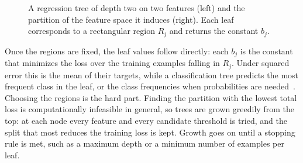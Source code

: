    \begin{figure}[t]
    \centering
    \caption{A regression tree of depth two on two features (left) and the
    partition of the feature space it induces (right). Each leaf corresponds to a
    rectangular region $R_j$ and returns the constant $b_j$.}
    \label{fig:bg:gbm:tree}
    \end{figure}
    
    Once the regions are fixed, the leaf values follow directly: each $b_j$ is the
    constant that minimizes the loss over the training examples falling in $R_j$.
    Under squared error this is the mean of their targets, while a classification
    tree predicts the most frequent class in the leaf, or the class frequencies
    when probabilities are needed~\cite{hastie2009}. Choosing the regions is the
    hard part. Finding the partition with the lowest total loss is computationally
    infeasible in general, so trees are grown greedily from the top: at each node
    every feature and every candidate threshold is tried, and the split that most
    reduces the training loss is kept. Growth goes on
    until a stopping rule is met, such as a maximum depth or a minimum number of
    examples per leaf.

